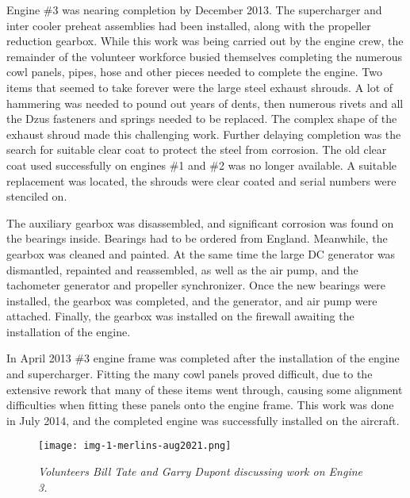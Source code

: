 Engine \#3 was nearing completion by December 2013. The supercharger and inter
cooler preheat assemblies had been installed, along with the propeller reduction
gearbox.  While this work was being carried out by the engine crew, the
remainder of the volunteer workforce busied themselves completing the numerous
cowl panels, pipes, hose and other pieces needed to complete the engine.  Two
items that seemed to take forever were the large steel exhaust shrouds.  A lot
of hammering was needed to pound out years of dents, then numerous rivets and
all the Dzus fasteners and springs needed to be replaced.  The complex shape of
the exhaust shroud made this challenging work.  Further delaying completion was
the search for suitable clear coat to protect the steel from corrosion.  The old
clear coat used successfully on engines \#1 and \#2 was no longer available.  A
suitable replacement was located, the shrouds were clear coated and serial
numbers were stenciled on.

The auxiliary gearbox was disassembled, and significant corrosion was found on
the bearings inside.  Bearings had to be ordered from England.  Meanwhile, the
gearbox was cleaned and painted.  At the same time the large DC generator was
dismantled, repainted and reassembled, as well as the air pump, and the
tachometer generator and propeller synchronizer.  Once the new bearings were
installed, the gearbox was completed, and the generator, and air pump were
attached.  Finally, the gearbox was installed on the firewall awaiting the
installation of the engine.

In April 2013 \#3 engine frame was completed after the installation of the engine
and supercharger.  Fitting the many cowl panels proved difficult, due to the
extensive rework that many of these items went through, causing some alignment
difficulties when fitting these panels onto the engine frame.  This work was
done in July 2014, and the completed engine was successfully installed on the
aircraft.

\begin{figure}[H]
   \vspace{2em}
   \centering
   \texttt{[image: img-1-merlins-aug2021.png]}
   \caption*{\small \em Volunteers Bill Tate and Garry Dupont discussing work on Engine 3.}
   \label{fig:img1}
\end{figure}


